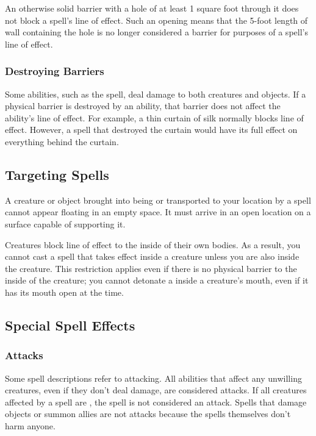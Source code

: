         An otherwise solid barrier with a hole of at least 1 square foot through it does not block a spell's line of effect.
        Such an opening means that the 5-foot length of wall containing the hole is no longer considered a barrier for purposes of a spell's line of effect.

        \subsubsection{Destroying Barriers}\label{Destroying Barriers}
            Some abilities, such as the  spell, deal damage to both creatures and objects.
            If a physical barrier is destroyed by an ability, that barrier does not affect the ability's line of effect.
            For example, a thin curtain of silk normally blocks line of effect.
            However, a spell that destroyed the curtain would have its full effect on everything behind the curtain.

    \subsection{Targeting Spells}

         A creature or object brought into being or transported to your location by a spell cannot appear floating in an empty space.
        It must arrive in an open location on a surface capable of supporting it.

         Creatures block line of effect to the inside of their own bodies.
        As a result, you cannot cast a spell that takes effect inside a creature unless you are also inside the creature.
        This restriction applies even if there is no physical barrier to the inside of the creature; you cannot detonate a  inside a creature's mouth, even if it has its mouth open at the time.

    \subsection{Special Spell Effects}

        \subsubsection{Attacks}
            Some spell descriptions refer to attacking.
            All abilities that affect any unwilling creatures, even if they don't deal damage, are considered attacks.
            If all creatures affected by a spell are , the spell is not considered an attack.
            Spells that damage objects or summon allies are not attacks because the spells themselves don't harm anyone.

